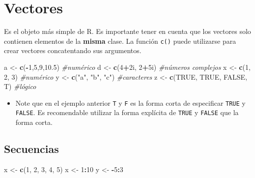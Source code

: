\documentclass[]{book}
\newenvironment{Shaded}{\begin{snugshade}}{\end{snugshade}}
\newcommand{\KeywordTok}[1]{\textcolor[rgb]{0.13,0.29,0.53}{\textbf{#1}}}
\newcommand{\DecValTok}[1]{\textcolor[rgb]{0.00,0.00,0.81}{#1}}
\newcommand{\FloatTok}[1]{\textcolor[rgb]{0.00,0.00,0.81}{#1}}
\newcommand{\StringTok}[1]{\textcolor[rgb]{0.31,0.60,0.02}{#1}}
\newcommand{\CommentTok}[1]{\textcolor[rgb]{0.56,0.35,0.01}{\textit{#1}}}
\newcommand{\OtherTok}[1]{\textcolor[rgb]{0.56,0.35,0.01}{#1}}
\newcommand{\OperatorTok}[1]{\textcolor[rgb]{0.81,0.36,0.00}{\textbf{#1}}}
\newcommand{\NormalTok}[1]{#1}
\newenvironment{rmdblock}[1]
{\begin{shaded*}
		\begin{itemize}
			\renewcommand{\labelitemi}{
				\raisebox{-.7\height}[0pt][0pt]{
					{\setkeys{Gin}{width=3em,keepaspectratio}\texttt{[image: images/\#1]}}
				}
			}
			\item
		}
		{
		\end{itemize}
	\end{shaded*}
}
\newenvironment{rmdnote}
{\begin{rmdblock}{note}}
	{\end{rmdblock}}
\begin{document}
\section{Vectores}\label{vectores}

Es el objeto más simple de R. Es importante tener en cuenta que los
vectores solo contienen elementos de la \textbf{misma} clase. La función
\texttt{c()} puede utilizarse para crear vectores concatentando sus
argumentos.

\begin{Shaded}
\begin{Highlighting}[]
\NormalTok{a <-}\StringTok{ }\KeywordTok{c}\NormalTok{(}\OperatorTok{-}\DecValTok{1}\NormalTok{,}\DecValTok{5}\NormalTok{,}\DecValTok{9}\NormalTok{,}\FloatTok{10.5}\NormalTok{)           }\CommentTok{#numérico}
\NormalTok{d <-}\StringTok{ }\KeywordTok{c}\NormalTok{(}\DecValTok{4}\OperatorTok{+}\NormalTok{2i, }\DecValTok{2}\OperatorTok{+}\NormalTok{5i)            }\CommentTok{#números complejos}
\NormalTok{x <-}\StringTok{ }\KeywordTok{c}\NormalTok{(}\DecValTok{1}\NormalTok{, }\DecValTok{2}\NormalTok{, }\DecValTok{3}\NormalTok{)               }\CommentTok{#numérico}
\NormalTok{y <-}\StringTok{ }\KeywordTok{c}\NormalTok{(}\StringTok{"a"}\NormalTok{, }\StringTok{"b"}\NormalTok{, }\StringTok{"c"}\NormalTok{)         }\CommentTok{#caracteres}
\NormalTok{z <-}\StringTok{ }\KeywordTok{c}\NormalTok{(}\OtherTok{TRUE}\NormalTok{, }\OtherTok{TRUE}\NormalTok{, }\OtherTok{FALSE}\NormalTok{, T)  }\CommentTok{#lógico}
\end{Highlighting}
\end{Shaded}

\begin{rmdnote}
Note que en el ejemplo anterior \texttt{T} y \texttt{F} es la forma
corta de especificar \texttt{TRUE} y \texttt{FALSE}. Es recomendable
utilizar la forma explícita de \texttt{TRUE} y \texttt{FALSE} que la
forma corta.
\end{rmdnote}

\subsection{Secuencias}\label{secuencias}

\begin{Shaded}
\begin{Highlighting}[]
\NormalTok{x <-}\StringTok{ }\KeywordTok{c}\NormalTok{(}\DecValTok{1}\NormalTok{, }\DecValTok{2}\NormalTok{, }\DecValTok{3}\NormalTok{, }\DecValTok{4}\NormalTok{, }\DecValTok{5}\NormalTok{) }
\NormalTok{x <-}\StringTok{ }\DecValTok{1}\OperatorTok{:}\DecValTok{10}
\NormalTok{y <-}\StringTok{ }\OperatorTok{-}\DecValTok{5}\OperatorTok{:}\DecValTok{3}
\end{Highlighting}
\end{Shaded}
\end{document}
